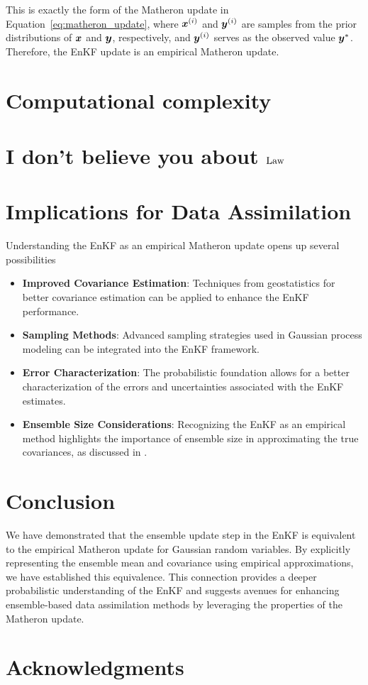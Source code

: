 \documentclass{article}
\begin{document}
This is exactly the form of the Matheron update in Equation~\eqref{eq:matheron_update}, where $\boldsymbol{x}^{(i)}$ and $\boldsymbol{y}^{(i)}$ are samples from the prior distributions of $\boldsymbol{x}$ and $\boldsymbol{y}$, respectively, and $\boldsymbol{y}^{(i)}$ serves as the observed value $\boldsymbol{y}^*$. Therefore, the EnKF update is an empirical Matheron update.

\section{Computational complexity}

\section{I don't believe you about $\operatorname{Law}$} \label{sec:density-please}

\section{Implications for Data Assimilation}

Understanding the EnKF as an empirical Matheron update opens up several possibilities

\begin{itemize}
    \item \textbf{Improved Covariance Estimation}: Techniques from geostatistics for better covariance estimation can be applied to enhance the EnKF performance.
    \item \textbf{Sampling Methods}: Advanced sampling strategies used in Gaussian process modeling can be integrated into the EnKF framework.
    \item \textbf{Error Characterization}: The probabilistic foundation allows for a better characterization of the errors and uncertainties associated with the EnKF estimates.
    \item \textbf{Ensemble Size Considerations}: Recognizing the EnKF as an empirical method highlights the importance of ensemble size in approximating the true covariances, as discussed in \citet{Fearnhead2018Particle}.
\end{itemize}

\section{Conclusion}

We have demonstrated that the ensemble update step in the EnKF is equivalent to the empirical Matheron update for Gaussian random variables. By explicitly representing the ensemble mean and covariance using empirical approximations, we have established this equivalence. This connection provides a deeper probabilistic understanding of the EnKF and suggests avenues for enhancing ensemble-based data assimilation methods by leveraging the properties of the Matheron update.

\section*{Acknowledgments}




\end{document}
